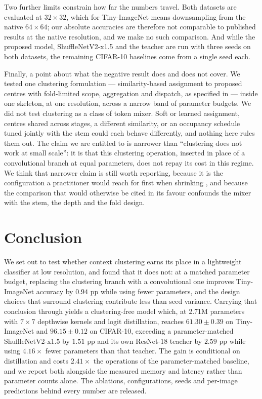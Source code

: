 Two further limits constrain how far the numbers travel. Both datasets are
evaluated at $32\times32$, which for Tiny-ImageNet means downsampling from the
native $64\times64$; our absolute accuracies are therefore not comparable to
published results at the native resolution, and we make no such comparison.
And while the proposed model, ShuffleNetV2-x1.5 and the teacher are run with
three seeds on both datasets, the remaining CIFAR-10 baselines come from a
single seed each.

Finally, a point about what the negative result does and does not cover. We
tested one clustering formulation --- similarity-based assignment to proposed
centres with fold-limited scope, aggregation and dispatch, as specified in
\cite{coc} --- inside one skeleton, at one resolution, across a narrow band of
parameter budgets. We did not test clustering as a class of token mixer.
Soft or learned assignment, centres shared across stages, a different
similarity, or an occupancy schedule tuned jointly with the stem could each
behave differently, and nothing here rules them out. The claim we are entitled
to is narrower than ``clustering does not work at small scale'': it is that
this clustering operation, inserted in place of a convolutional branch at
equal parameters, does not repay its cost in this regime. We think that
narrower claim is still worth reporting, because it is the configuration a
practitioner would reach for first when shrinking \cite{coc}, and because the
comparison that would otherwise be cited in its favour confounds the mixer
with the stem, the depth and the fold design.

\section{Conclusion}
\label{sec:conclusion}

We set out to test whether context clustering earns its place in a lightweight
classifier at low resolution, and found that it does not: at a matched
parameter budget, replacing the clustering branch with a convolutional one
improves Tiny-ImageNet accuracy by $0.94$ pp while using fewer parameters, and
the design choices that surround clustering contribute less than seed
variance. Carrying that conclusion through yields a clustering-free model
which, at 2.71M parameters with $7\times7$ depthwise kernels and logit
distillation, reaches $61.30 \pm 0.39$ on Tiny-ImageNet and $96.15 \pm 0.12$ on
CIFAR-10, exceeding a parameter-matched ShuffleNetV2-x1.5 by $1.51$ pp and its
own ResNet-18 teacher by $2.59$ pp while using $4.16\times$ fewer parameters
than that teacher. The gain is conditional on distillation and costs
$2.41\times$ the operations of the parameter-matched baseline, and we report
both alongside the measured memory and latency rather than parameter counts
alone. The ablations, configurations, seeds and per-image predictions behind
every number are released.
